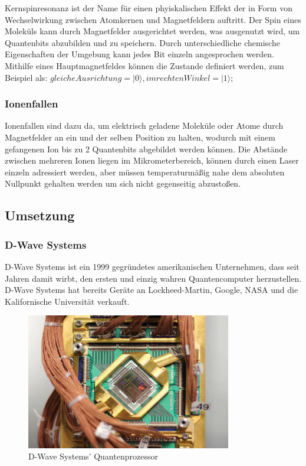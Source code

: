 Kernspinresonanz ist der Name für einen phyiskalischen Effekt der in Form von Wechselwirkung zwischen Atomkernen und Magnetfeldern auftritt. Der Spin eines Moleküls kann durch Magnetfelder ausgerichtet werden, was ausgenutzt wird, um Quantenbits abzubilden und zu speichern. Durch unterschiedliche chemische Eigenschaften der Umgebung kann jedes Bit einzeln angesprochen werden. Mithilfe eines Hauptmagnetfeldes können die Zustande definiert werden, zum Beispiel als: $gleiche Ausrichtung = |0\rangle, im rechten Winkel = |1\rangle$;


\subsubsection{Ionenfallen}
\label{sec:Ionenfallen}

Ionenfallen sind dazu da, um elektrisch geladene Moleküle oder Atome durch Magnetfelder an ein und der selben Position zu halten, wodurch mit einem gefangenen Ion bis zu 2 Quantenbits abgebildet werden können. Die Abstände zwischen mehreren Ionen liegen im Mikrometerbereich, können durch einen Laser einzeln adressiert werden, aber müssen temperaturmäßig nahe dem absoluten Nullpunkt gehalten werden um sich nicht gegenseitig abzustoßen.


\subsection{Umsetzung}
\label{sec:Umsetzung}

\subsubsection{D-Wave Systems}
\label{sec:D-Wave Systems}

D-Wave Systems ist ein 1999 gegründetes amerikanischen Unternehmen, dass seit Jahren damit wirbt, den ersten und einzig wahren Quantencomputer herzustellen. D-Wave Systems hat bereits Geräte an Lockheed-Martin, Google, NASA und die Kalifornische Universität verkauft.

\begin{figure}[!htb]
	\centering\includegraphics[width=0.8\textwidth]{images/d_wave.jpg}
	\caption{D-Wave Systems' Quantenprozessor}
	\label{dwave}
\end{figure}

